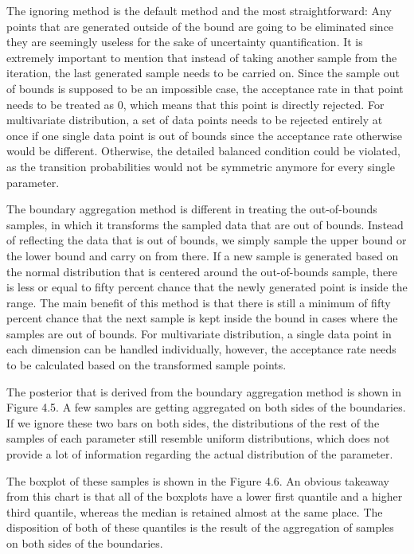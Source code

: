 The ignoring method is the default method and the most straightforward: Any points that are generated outside of the bound are going to be eliminated since they are seemingly useless for the sake of uncertainty quantification. It is extremely important to mention that instead of taking another sample from the iteration, the last generated sample needs to be carried on. Since the sample out of bounds is supposed to be an impossible case, the acceptance rate in that point needs to be treated as 0, which means that this point is directly rejected. For multivariate distribution, a set of data points needs to be rejected entirely at once if one single data point is out of bounds since the acceptance rate otherwise would be different. Otherwise, the detailed balanced condition could be violated, as the transition probabilities would not be symmetric anymore for every single parameter.

The boundary aggregation method is different in treating the out-of-bounds samples, in which it transforms the sampled data that are out of bounds. Instead of reflecting the data that is out of bounds, we simply sample the upper bound or the lower bound and carry on from there. If a new sample is generated based on the normal distribution that is centered around the out-of-bounds sample, there is less or equal to fifty percent chance that the newly generated point is inside the range.\cite{gaussian_distribution_property} The main benefit of this method is that there is still a minimum of fifty percent chance that the next sample is kept inside the bound in cases where the samples are out of bounds. For multivariate distribution, a single data point in each dimension can be handled individually, however, the acceptance rate needs to be calculated based on the transformed sample points. 

The posterior that is derived from the boundary aggregation method is shown in Figure 4.5.  A few samples are getting aggregated on both sides of the boundaries. If we ignore these two bars on both sides, the distributions of the rest of the samples of each parameter still resemble uniform distributions, which does not provide a lot of information regarding the actual distribution of the parameter. 

The boxplot of these samples is shown in the Figure 4.6. An obvious takeaway from this chart is that all of the boxplots have a lower first quantile and a higher third quantile, whereas the median is retained almost at the same place. The disposition of both of these quantiles is the result of the aggregation of samples on both sides of the boundaries.


